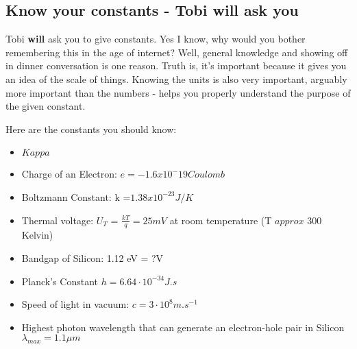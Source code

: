 \subsection{Know your constants - Tobi will ask you}

Tobi \textbf{will} ask you to give constants. Yes I know, why would you bother remembering this in the age of internet? Well, general knowledge and showing off in dinner conversation is one reason. Truth is, it's important because it gives you an idea of the scale of things. Knowing the units is also very important, arguably more important than the numbers - helps you properly understand the purpose of the given constant.

Here are the constants you should know: 

\begin{itemize}
    \item $Kappa$
    \item Charge of an Electron: $e = -1.6 x 10^-19 Coulomb$
    \item Boltzmann Constant: k =$1.38 x 10^{-23} J/K$
    \item Thermal voltage: $U_T$ = $\frac{kT}{q} = 25mV$ at room temperature (T $approx$ 300 Kelvin)
    \item Bandgap of Silicon: 1.12 eV = ?V
    \item Planck's Constant $h = 6.64 \cdot 10^{-34} J.s$
    \item Speed of light in vacuum: $c = 3 \cdot 10^8 m.s^{-1}$
    \item Highest photon wavelength that can generate an electron-hole pair in Silicon $\lambda_{max} = 1.1 \mu m$
\end{itemize}
